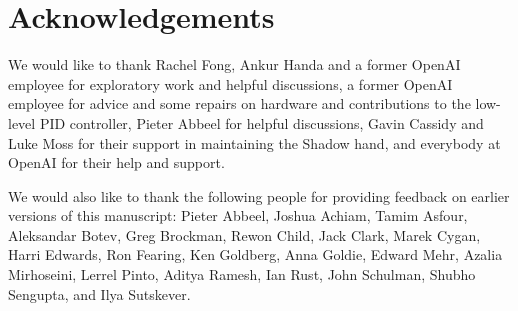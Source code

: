 \section*{Acknowledgements}

We would like to thank Rachel Fong, Ankur Handa and a former OpenAI employee for exploratory work and helpful discussions, a former OpenAI employee for advice and some repairs on hardware and contributions to the low-level PID controller, Pieter Abbeel for helpful discussions, Gavin Cassidy and Luke Moss for their support in maintaining the Shadow hand, and everybody at OpenAI for their help and support.


We would also like to thank the following people for providing feedback on earlier versions of this manuscript: Pieter Abbeel, Joshua Achiam, Tamim Asfour, Aleksandar Botev, Greg Brockman, Rewon Child, Jack Clark, Marek Cygan, Harri Edwards, Ron Fearing, Ken Goldberg, Anna Goldie, Edward Mehr, Azalia Mirhoseini, Lerrel Pinto, Aditya Ramesh, Ian Rust, John Schulman, Shubho Sengupta, and Ilya Sutskever.

